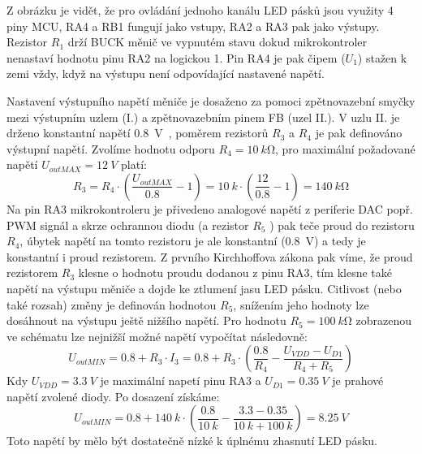     Z obrázku je vidět, že pro ovládání jednoho kanálu LED pásků jsou využity 4 piny MCU, RA4 a RB1 fungují jako vstupy, RA2 a RA3 pak jako výstupy. Rezistor \(R_{1}\) drží BUCK měnič ve vypnutém stavu dokud mikrokontroler nenastaví hodnotu pinu RA2 na logickou 1. Pin RA4 je pak čipem (\(U_{1} \)) stažen k zemi vždy, když na výstupu není odpovídající nastavené napětí.  
    
    Nastavení výstupního napětí měniče je dosaženo za pomoci zpětnovazební smyčky mezi výstupním uzlem (I.) a zpětnovazebním pinem FB (uzel II.). V uzlu II. je drženo konstantní napětí \qty{0.8}{V}~\cite{TODO}, poměrem rezistorů \(R_{3} \) a \(R_{4} \) je pak definováno výstupní napětí. Zvolíme hodnotu odporu \(R_{4} = \qty{10}{k\ohm}\), pro maximální požadované napětí \(U_{outMAX} = \qty{12}{V}\) platí:
    \begin{equation}
        R_{3} = R_{4}\cdot \left(\frac{U_{outMAX} }{\num{0.8}}-1\right) = \qty{10}{k}\cdot \left(\frac{12}{\num{0.8}}-1\right) = \qty{140}{k\ohm}
    \end{equation} 
    Na pin RA3 mikrokontroleru je přivedeno analogové napětí z periferie DAC popř. PWM signál a skrze ochrannou diodu (a rezistor \(R_{5} \) ) pak teče proud do rezistoru \(R_{4} \), úbytek napětí na tomto rezistoru je ale konstantní (\qty{0.8}{V}) a tedy je konstantní i proud rezistorem. Z prvního Kirchhoffova zákona pak víme, že proud rezistorem \(R_{3} \) klesne o hodnotu proudu dodanou z pinu RA3, tím klesne také napětí na výstupu měniče a dojde ke ztlumení jasu LED pásku. Citlivost (nebo také rozsah) změny je definován hodnotou \(R_{5} \), snížením jeho hodnoty lze dosáhnout na výstupu ještě nižšího napětí. Pro hodnotu \(R_{5} = \qty{100}{k\ohm}\) zobrazenou ve schématu lze nejnižší možné napětí vypočítat následovně:
    \begin{equation}
        U_{outMIN} = \num{0.8}+R_{3} \cdot I_{3} = \num{0.8}+R_{3} \cdot \left(\frac{\num{0.8}}{R_{4}} - \frac{U_{VDD} - U_{D1}}{R_{4}+R_{5}} \right) 
    \end{equation}  
    Kdy \(U_{VDD} = \qty{3.3}{V}\) je maximální napetí pinu RA3 a \(U_{D1}=\qty{0.35}{V} \) je prahové napětí zvolené diody. Po dosazení získáme:
    \begin{equation}
        U_{outMIN} = \num{0.8}+\qty{140}{k} \cdot \left(\frac{\num{0.8}}{\qty{10}{k}} - \frac{\num{3.3} - \num{0.35}}{\qty{10}{k}+\qty{100}{k}} \right) = \qty{8.25}{V}
    \end{equation}  
    Toto napětí by mělo být dostatečně nízké k úplnému zhasnutí LED pásku.

